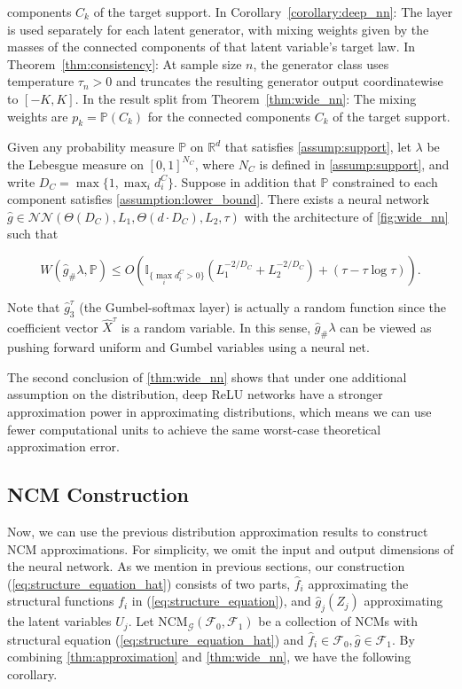 components $C_k$ of the target support. In Corollary~\ref{corollary:deep_nn}: The layer is used separately for each latent generator, with mixing weights given by the masses of the connected components of that latent variable's target law. In Theorem~\ref{thm:consistency}: At sample size $n$, the generator class uses temperature $\tau_n>0$ and truncates the resulting generator output coordinatewise to $[-K,K]$. In the result split from Theorem~\ref{thm:wide_nn}: The mixing weights are $p_k=\mathbb{P}(C_k)$ for the connected components $C_k$ of the target support.

\begin{corollary}\label{thm:cor-fix-3c402872}
Given any probability measure $\mathbb P$ on $\mathbb R^d$ that satisfies \cref{assump:support}, let $\lambda$ be the Lebesgue measure on $[0,1]^{N_C}$, where $N_C$ is defined in \cref{assump:support}, and write $D_C=\max\{1,\max_i d_i^C\}$. Suppose in addition that $\mathbb P$ constrained to each component satisfies \cref{assumption:lower_bound}. There exists a neural network $\hat g\in\mathcal{NN}(\Theta(D_C),L_1,\Theta(d\cdot D_C),L_2,\tau)$ with the architecture of \cref{fig:wide_nn} such that

\[
W(\hat g_{\#}\lambda,\mathbb P)\leqslant O\left(\mathbb I_{\{\max_i d_i^C>0\}}\left(L_1^{-2/D_C}+L_2^{-2/D_C}\right)+(\tau-\tau\log\tau)\right).
\]
\end{corollary}


Note that $\hat{g}^\tau_3$ (the Gumbel-softmax layer) is actually a random function since the coefficient vector $\hat{X}^\tau$ is a random variable. In this sense, $\hat{g}_{\#} \lambda$ can be viewed as pushing forward uniform and Gumbel variables using a neural net. 

The second conclusion of \cref{thm:wide_nn} shows that under one additional assumption on the distribution, deep ReLU networks have a stronger approximation power in approximating distributions, which means we can use fewer computational units to achieve the same worst-case theoretical approximation error. 

\subsection{NCM Construction}\label{sec:ncm_const}
Now, we can use the previous distribution approximation results to construct NCM approximations. For simplicity, we omit the input and output dimensions of the neural network. As we mention in previous sections, our construction (\ref{eq:structure_equation_hat}) consists of two parts, $ \hat{f}_{i}$ approximating the structural functions $f_i$ in (\ref{eq:structure_equation}), and $ \hat{g}_{j}(Z_j) $ approximating the latent variables $U_j$. Let $ \text{NCM}_{\mathcal{G}}(\mathcal{F}_0,\mathcal{F}_1)$ be a collection of NCMs with structural equation (\ref{eq:structure_equation_hat}) and $ \hat{f}_{i} \in \mathcal{F}_0, \hat{g} \in \mathcal{F}_1. $ 
By combining \cref{thm:approximation} and \cref{thm:wide_nn}, we have the following corollary. 

